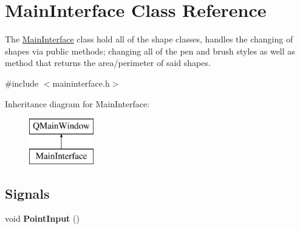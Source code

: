 \hypertarget{class_main_interface}{}\section{Main\+Interface Class Reference}
\label{class_main_interface}


The \hyperlink{class_main_interface}{Main\+Interface} class hold all of the shape classes, handles the changing of shapes via public methods; changing all of the pen and brush styles as well as method that returns the area/perimeter of said shapes.  




{\ttfamily \#include $<$maininterface.\+h$>$}

Inheritance diagram for Main\+Interface\+:\begin{figure}[H]
\begin{center}
\leavevmode
\includegraphics[height=2.000000cm]{class_main_interface}
\end{center}
\end{figure}
\subsection*{Signals}
\begin{DoxyCompactItemize}
\item 
\mbox{\label{class_main_interface_aafb8558985bae8b8bc0d58dd0161cb02}} 
void {\bfseries Point\+Input} ()
\end{DoxyCompactItemize}
